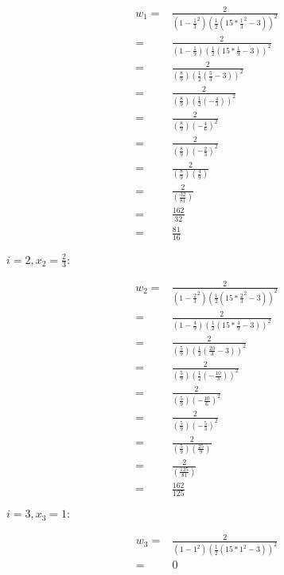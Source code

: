 \documentclass{article}
\begin{document}
\begin{enumerate}
\begin{enumerate}
    \begin{equation*}
      \begin{split}
        w_1 = & \frac{2}{(1 - \frac{1}{3}^2) \left( \frac{1}{2} (15*
          \frac{1}{3}^2 - 3) \right)^2} \\
        = & \frac{2}{(1 - \frac{1}{9}) \left( \frac{1}{2} (15*
          \frac{1}{9} - 3) \right)^2} \\
        = & \frac{2}{(\frac{8}{9}) \left( \frac{1}{2} (\frac{5}{3} -
          3) \right)^2} \\
        = & \frac{2}{(\frac{8}{9}) \left( \frac{1}{2} (- \frac{4}{3})
          \right)^2} \\
        = & \frac{2}{(\frac{8}{9}) \left(- \frac{4}{6} \right)^2} \\
        = & \frac{2}{(\frac{8}{9}) \left(- \frac{2}{3} \right)^2} \\
        = & \frac{2}{(\frac{8}{9}) \left(\frac{4}{9} \right)} \\
        = & \frac{2}{(\frac{32}{81}) } \\
        = & \frac{162}{32} \\
        = & \frac{81}{16}
      \end{split}
    \end{equation*}

    $i = 2, x_2 = \frac{2}{3} :$

    \begin{equation*}
      \begin{split}
        w_2 = & \frac{2}{(1 - \frac{2}{3}^2) \left( \frac{1}{2} (15*
          \frac{2}{3}^2 - 3) \right)^2} \\
        = & \frac{2}{(1 - \frac{4}{9}) \left( \frac{1}{2} (15*
          \frac{4}{9} - 3) \right)^2} \\
        = & \frac{2}{(\frac{5}{9}) \left( \frac{1}{2} (\frac{20}{3} -
          3) \right)^2} \\
        = & \frac{2}{(\frac{5}{9}) \left( \frac{1}{2} (- \frac{10}{3})
          \right)^2} \\
        = & \frac{2}{(\frac{5}{9}) \left(- \frac{10}{6} \right)^2} \\
        = & \frac{2}{(\frac{5}{9}) \left(- \frac{5}{3} \right)^2} \\
        = & \frac{2}{(\frac{5}{9}) \left(\frac{25}{9} \right)} \\
        = & \frac{2}{(\frac{125}{81}) } \\
        = & \frac{162}{125}
      \end{split}
    \end{equation*}

    $i = 3, x_3 = 1 :$

    \begin{equation*}
      \begin{split}
        w_3 = & \frac{2}{(1 - 1^2) \left( \frac{1}{2} (15* 1^2 -
          3) \right)^2} \\
        = & 0
      \end{split}
    \end{equation*}


  \end{enumerate}

  
\end{enumerate}
\end{document}
